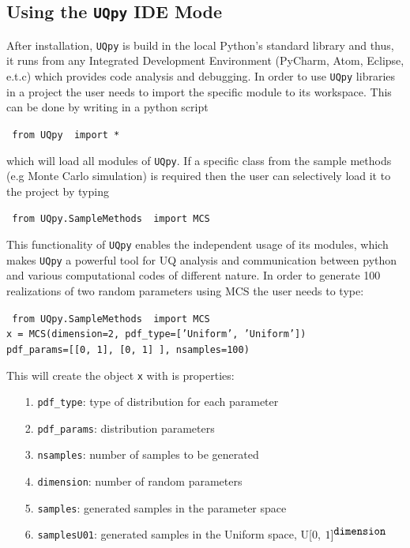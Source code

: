 \documentclass[preprint,12pt]{elsarticle}
\begin{document}
\subsection{Using the \texttt{UQpy}  IDE Mode}

\noindent
After installation, \texttt{UQpy} is build in the local Python’s standard library and thus, it runs from any Integrated Development Environment (PyCharm, Atom, Eclipse, e.t.c) which provides code analysis and debugging. In order to use \texttt{UQpy} libraries in a project the user needs to import the specific module to its workspace. This can be done by writing in a python script

\vspace{4mm}
{\centering
 \texttt{{\color{blue} from} \texttt{UQpy} {\color{blue} import} * }\par}
\vspace{4mm}

\noindent
which will load all modules of \texttt{UQpy}. If a specific class from the sample methods  (e.g Monte Carlo simulation) is required then the user can selectively load it to the project by typing 
\vspace{4mm}

{\centering
 \texttt{{\color{blue} from} \texttt{UQpy.SampleMethods} {\color{blue} import} MCS }\par}

\vspace{4mm}
\noindent
This functionality of \texttt{UQpy} enables the independent usage of its  modules, which makes \texttt{UQpy} a powerful tool for UQ analysis and communication between python and various computational codes of different nature.  In order to generate 100 realizations of two random parameters using MCS  the user needs to type:
\vspace{4mm}

{\centering
	\texttt{{\color{blue} from} \texttt{UQpy.SampleMethods} {\color{blue} import} MCS }\\
	\texttt{x = MCS(dimension=2, pdf\_type=['Uniform', 'Uniform'])\\
	pdf\_params=[[0, 1], [0, 1] ], nsamples=100)}\par}

\vspace{4mm}
\noindent
This will create the object \texttt{x} with is properties:

\begin{itemize}
	\item[1.] \texttt{pdf\_type}: type of distribution for each parameter
	\item[2.] \texttt{pdf\_params}: distribution parameters
	\item[3.] \texttt{nsamples}: number of samples to be generated
	\item[4.] \texttt{dimension}: number of random parameters
	\item[5.] \texttt{samples}: generated samples in the parameter space
	\item[6.] \texttt{samplesU01}: generated samples in the Uniform space, U[0, $1]^{\mbox{\texttt{dimension}}}$
	\end{itemize}
\end{document}
